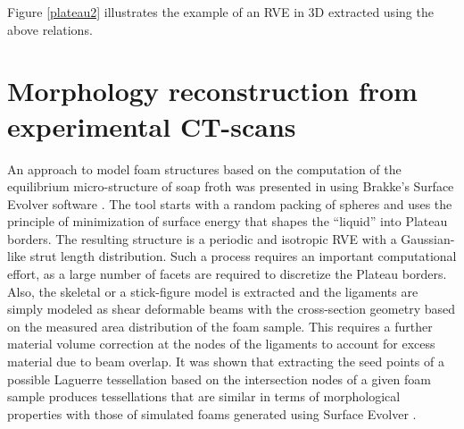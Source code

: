 Figure \ref{plateau2} illustrates the example of an RVE in 3D extracted using the above relations.

\section{Morphology reconstruction from experimental CT-scans}\label{of-CT}

An approach to model foam structures based on the computation of the equilibrium micro-structure of soap froth was presented in \cite{jangMicrostructureOpencellFoams2008} using Brakke's Surface Evolver software \cite{brakkeMinimalSurfacesCorners1992,kraynikStructureRandomMonodisperse2003}. The tool starts with a random packing of spheres and uses the principle of minimization of surface energy that shapes the ``liquid'' into Plateau borders. The resulting structure is a periodic and isotropic RVE with a Gaussian-like strut length distribution. Such a process requires an important computational effort, as a large number of facets are required to discretize the Plateau borders. Also, the skeletal or a stick-figure model is extracted and the ligaments are simply modeled as shear deformable beams with the cross-section geometry based on the measured area distribution of the foam sample. This requires a further material volume correction at the nodes of the ligaments to account for excess material due to beam overlap. It was shown that extracting the seed points of a possible Laguerre tessellation based on the intersection nodes of a given foam sample produces tessellations that are similar in terms of morphological properties with those of simulated foams generated using Surface Evolver \cite{liebscherLaguerreApproximationRandom2015}.

